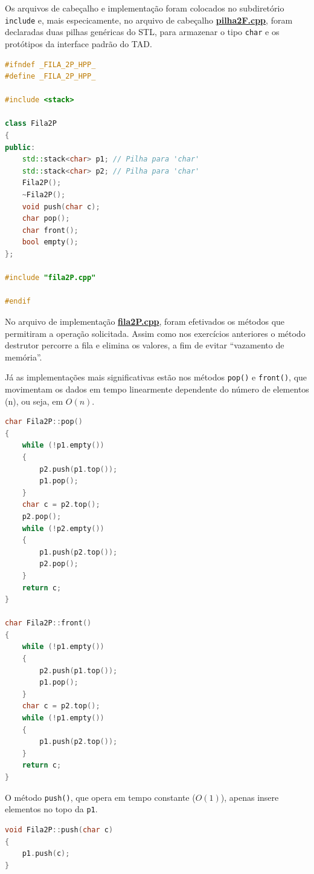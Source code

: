 \documentclass[
  brazilian,
  paper=a4,
  oneside  ,captions=tableheading
]{scrbook}
\newcommand{\passthrough}[1]{#1}
\begin{document}
Os arquivos de cabeçalho e implementação foram colocados no subdiretório
\passthrough{\lstinline!include!} e, mais especicamente, no arquivo de
cabeçalho
\href{https://github.com/ecostadelle/lista_pilhas_filas/blob/main/include/pilha2F.cpp}{\textbf{pilha2F.cpp}},
foram declaradas duas pilhas genéricas do STL, para armazenar o tipo
\passthrough{\lstinline!char!} e os protótipos da interface padrão do
TAD.

\begin{lstlisting}[language={C++}]
#ifndef _FILA_2P_HPP_
#define _FILA_2P_HPP_

#include <stack>

class Fila2P
{
public:
    std::stack<char> p1; // Pilha para 'char'
    std::stack<char> p2; // Pilha para 'char'
    Fila2P();
    ~Fila2P();
    void push(char c);
    char pop();
    char front();
    bool empty();
};

#include "fila2P.cpp"

#endif
\end{lstlisting}

No arquivo de implementação
\href{https://github.com/ecostadelle/lista_pilhas_filas/blob/main/include/fila2P.cpp}{\textbf{fila2P.cpp}},
foram efetivados os métodos que permitiram a operação solicitada. Assim
como nos exercícios anteriores o método destrutor percorre a fila e
elimina os valores, a fim de evitar ``vazamento de memória''.

Já as implementações mais significativas estão nos métodos
\passthrough{\lstinline!pop()!} e \passthrough{\lstinline!front()!}, que
movimentam os dados em tempo linearmente dependente do número de
elementos (n), ou seja, em \(O(n)\).

\begin{lstlisting}[language={C++}]
char Fila2P::pop()
{
    while (!p1.empty())
    {
        p2.push(p1.top());
        p1.pop();
    }
    char c = p2.top();
    p2.pop();
    while (!p2.empty())
    {
        p1.push(p2.top());
        p2.pop();
    }
    return c;
}

char Fila2P::front()
{
    while (!p1.empty())
    {
        p2.push(p1.top());
        p1.pop();
    }
    char c = p2.top();
    while (!p1.empty())
    {
        p1.push(p2.top());
    }
    return c;
}
\end{lstlisting}

O método \passthrough{\lstinline!push()!}, que opera em tempo constante
(\(O(1)\)), apenas insere elementos no topo da
\passthrough{\lstinline!p1!}.

\begin{lstlisting}[language={C++}]
void Fila2P::push(char c)
{
    p1.push(c);
}
\end{lstlisting}
\end{document}
